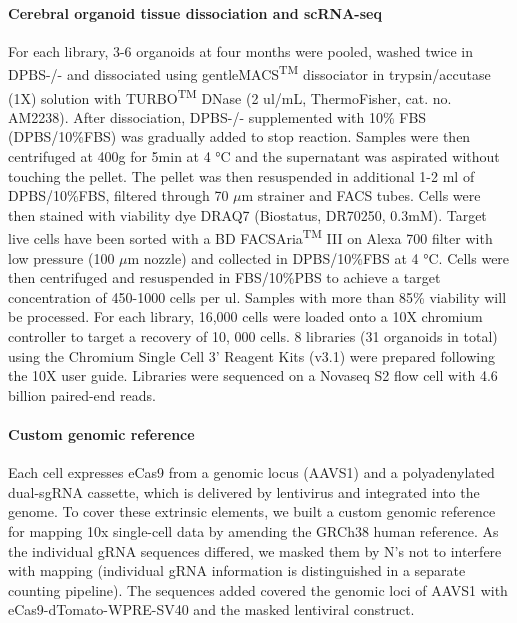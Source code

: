 \paragraph{Cerebral organoid tissue dissociation and scRNA-seq}
For each library, 3-6 organoids at four months were pooled, washed twice in DPBS-/- and dissociated using gentleMACS\textsuperscript{TM} dissociator in trypsin/accutase (1X) solution with TURBO\textsuperscript{TM} DNase (2 ul/mL, ThermoFisher, cat. no. AM2238). After dissociation, DPBS-/- supplemented with 10\% FBS (DPBS/10\%FBS) was gradually added to stop reaction. Samples were then centrifuged at 400g for 5min at 4 °C and the supernatant was aspirated without touching the pellet. The pellet was then resuspended in additional 1-2 ml of DPBS/10\%FBS, filtered through 70 $\mu$m strainer and FACS tubes. Cells were then stained with viability dye DRAQ7 (Biostatus, DR70250, 0.3mM). Target live cells have been sorted with a BD FACSAria\textsuperscript{TM} III on Alexa 700 filter with low pressure (100 $\mu$m nozzle) and collected in DPBS/10\%FBS at 4 °C. Cells were then centrifuged and resuspended in FBS/10\%PBS to achieve a target concentration of 450-1000 cells per ul. Samples with more than 85\% viability will be processed. For each library, 16,000 cells were loaded onto a 10X chromium controller to target a recovery of 10, 000 cells. 8 libraries (31 organoids in total) using the Chromium Single Cell 3' Reagent Kits (v3.1) were prepared following the 10X user guide. Libraries were sequenced on a Novaseq S2 flow cell with 4.6 billion paired-end reads.


\paragraph{Custom genomic reference}
Each cell expresses eCas9 from a genomic locus (AAVS1) and a polyadenylated dual-sgRNA cassette, which is delivered by lentivirus and integrated into the genome. To cover these extrinsic elements, we built a custom genomic reference for mapping 10x single-cell data by amending the GRCh38 human reference. As the individual gRNA sequences differed, we masked them by N's not to interfere with mapping (individual gRNA information is distinguished in a separate counting pipeline). The sequences added covered the genomic loci of AAVS1 with eCas9-dTomato-WPRE-SV40 and the masked lentiviral construct.


